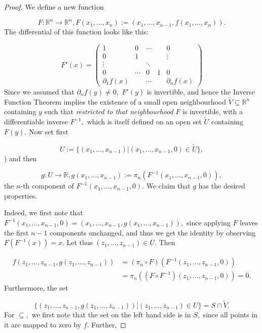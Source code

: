 \begin{proof}
 
We define a new function

\[F: \mathbb R^n \to \mathbb R^n, F(x_1, \ldots, x_n) := (x_1, \ldots, x_{n-1}, f(x_1, \ldots, x_n)).\]
The differential of this function looks like this:

\[F'(x) = \begin{pmatrix}
1 & 0 & \cdots & & 0 \\
0 & 1 & & & \vdots \\
\vdots & & \ddots & & \\
0 & \cdots & 0 & 1 & 0 \\
\partial_1 f(x) & & \cdots & & \partial_n f(x)
\end{pmatrix}\] Since we assumed that \(\partial_n f(y) \neq 0,\)
\(F'(y)\) is invertible, and hence the Inverse Function Theorem implies
the existence of a small open neighbourhood
\(\tilde V \subseteq \mathbb R^n\) containing \(y\) such that
\emph{restricted to that neighbourhood} \(F\) is  invertible, with
a differentiable inverse \(F^{-1},\) which is itself defined on an open
set \(\tilde U\) containing \(F(y)\). Now set first

\[U := \{(x_1, \ldots, x_{n-1}) | (x_1, \ldots, x_{n-1}, 0) \in \tilde U \},\]
) and then

\[g: U \to \mathbb R, g(x_1, \ldots, x_{n-1}) := \pi_n(F^{-1}(x_1, \ldots, x_{n-1}, 0)),\]
the \(n\)-th component of \(F^{-1}(x_1, \ldots, x_{n-1}, 0)\). We claim
that \(g\) has the desired properties.

Indeed, we first note that
\(F^{-1}(x_1, \ldots, x_{n-1}, 0) = (x_1, \ldots, x_{n-1}, g(x_1, \ldots, x_{n-1})),\)
since applying \(F\) leaves the first \(n-1\) components unchanged, and
thus we get the identity by observing \(F(F^{-1}(x)) = x\). Let thus
\((z_1, \ldots, z_{n-1}) \in U\). Then

\begin{align}
f(z_1, \ldots, z_{n-1}, g(z_1, \ldots, z_{n-1})) & = (\pi_n \circ F)(F^{-1}(z_1, \ldots, z_{n-1}, 0)) \\
& = \pi_n((F \circ F^{-1})(z_1, \ldots, z_{n-1}, 0)) = 0.
\end{align} Furthermore, the set



\[\{(z_1, \ldots, z_{n-1}, g(z_1, \ldots, z_{n-1})) | (z_1, \ldots, z_{n-1}) \in U\} = S \cap \tilde V.\]
For \(\subseteq,\) we first note that the set on the left hand side is
in \(S,\) since all points in it are mapped to zero by \(f\). Further,


\end{proof}
